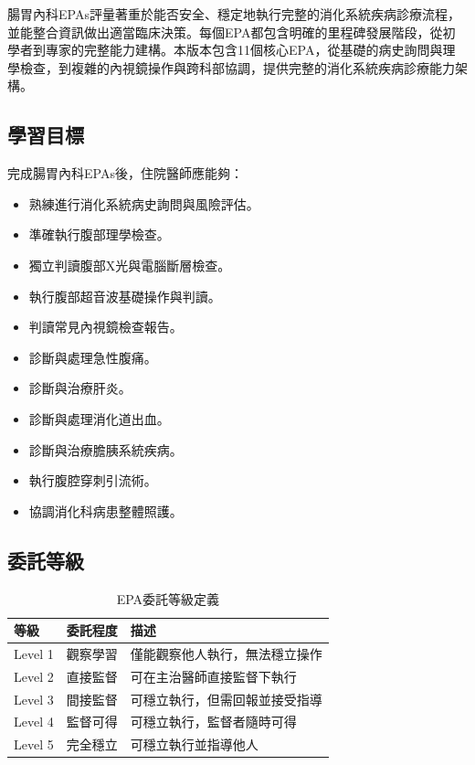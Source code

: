 \documentclass[12pt,a4paper]{article}
\newcommand{\note}[1]{
    \par
    \noindent
    \begin{tcolorbox}[
        colback=gi_blue!5!white,
        colframe=gi_blue,
        title=\textbf{重點提醒},
        fonttitle=\bfseries,
        boxrule=0.5pt,
        arc=3pt,
        left=6pt,
        right=6pt,
        top=6pt,
        bottom=6pt
    ]
    #1
    \end{tcolorbox}
}
\begin{document}
\vspace{0.5cm}
\note{
腸胃內科EPAs評量著重於能否安全、穩定地執行完整的消化系統疾病診療流程，並能整合資訊做出適當臨床決策。每個EPA都包含明確的里程碑發展階段，從初學者到專家的完整能力建構。本版本包含11個核心EPA，從基礎的病史詢問與理學檢查，到複雜的內視鏡操作與跨科部協調，提供完整的消化系統疾病診療能力架構。
}

\subsection{學習目標}
完成腸胃內科EPAs後，住院醫師應能夠：
\begin{itemize}[nosep]
    \item 熟練進行消化系統病史詢問與風險評估。
    \item 準確執行腹部理學檢查。
    \item 獨立判讀腹部X光與電腦斷層檢查。
    \item 執行腹部超音波基礎操作與判讀。
    \item 判讀常見內視鏡檢查報告。
    \item 診斷與處理急性腹痛。
    \item 診斷與治療肝炎。
    \item 診斷與處理消化道出血。
    \item 診斷與治療膽胰系統疾病。
    \item 執行腹腔穿刺引流術。
    \item 協調消化科病患整體照護。
\end{itemize}

\subsection{委託等級}
\begin{table}[h]
    \centering
    \caption{EPA委託等級定義}
    \begin{tabular}{p{2cm} p{3cm} p{9cm}}
        \toprule
        \textbf{等級} & \textbf{委託程度} & \textbf{描述} \\
        \midrule
        Level 1 & 觀察學習 & 僅能觀察他人執行，無法穩立操作 \\
        Level 2 & 直接監督 & 可在主治醫師直接監督下執行 \\
        Level 3 & 間接監督 & 可穩立執行，但需回報並接受指導 \\
        Level 4 & 監督可得 & 可穩立執行，監督者隨時可得 \\
        Level 5 & 完全穩立 & 可穩立執行並指導他人 \\
        \bottomrule
    \end{tabular}
\end{table}
\end{document}
